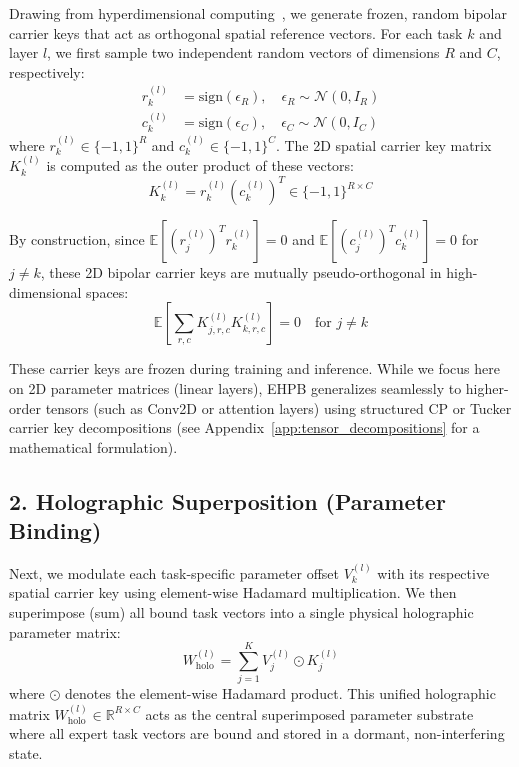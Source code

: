 Drawing from hyperdimensional computing~\cite{kanerva2009hyperdimensional}, we generate frozen, random bipolar carrier keys that act as orthogonal spatial reference vectors. For each task $k$ and layer $l$, we first sample two independent random vectors of dimensions $R$ and $C$, respectively:
\begin{align}
r_k^{(l)} &= \text{sign}(\epsilon_R), \quad \epsilon_R \sim \mathcal{N}(0, I_R) \\
c_k^{(l)} &= \text{sign}(\epsilon_C), \quad \epsilon_C \sim \mathcal{N}(0, I_C)
\end{align}
where $r_k^{(l)} \in \{-1, 1\}^R$ and $c_k^{(l)} \in \{-1, 1\}^C$. The 2D spatial carrier key matrix $K_k^{(l)}$ is computed as the outer product of these vectors:
\begin{equation}
K_k^{(l)} = r_k^{(l)} \left( c_k^{(l)} \right)^T \in \{-1, 1\}^{R \times C}
\end{equation}

By construction, since $\mathbb{E}[(r_j^{(l)})^T r_k^{(l)}] = 0$ and $\mathbb{E}[(c_j^{(l)})^T c_k^{(l)}] = 0$ for $j \neq k$, these 2D bipolar carrier keys are mutually pseudo-orthogonal in high-dimensional spaces:
\begin{equation}
\mathbb{E} \left[ \sum_{r, c} K_{j, r, c}^{(l)} K_{k, r, c}^{(l)} \right] = 0 \quad \text{for } j \neq k
\end{equation}

These carrier keys are frozen during training and inference. While we focus here on 2D parameter matrices (linear layers), EHPB generalizes seamlessly to higher-order tensors (such as Conv2D or attention layers) using structured CP or Tucker carrier key decompositions (see Appendix~\ref{app:tensor_decompositions} for a mathematical formulation).

\subsection{2. Holographic Superposition (Parameter Binding)}

Next, we modulate each task-specific parameter offset $V_k^{(l)}$ with its respective spatial carrier key using element-wise Hadamard multiplication. We then superimpose (sum) all bound task vectors into a single physical holographic parameter matrix:
\begin{equation}
W_{\text{holo}}^{(l)} = \sum_{j=1}^K V_j^{(l)} \odot K_j^{(l)}
\end{equation}
where $\odot$ denotes the element-wise Hadamard product. This unified holographic matrix $W_{\text{holo}}^{(l)} \in \mathbb{R}^{R \times C}$ acts as the central superimposed parameter substrate where all expert task vectors are bound and stored in a dormant, non-interfering state.

